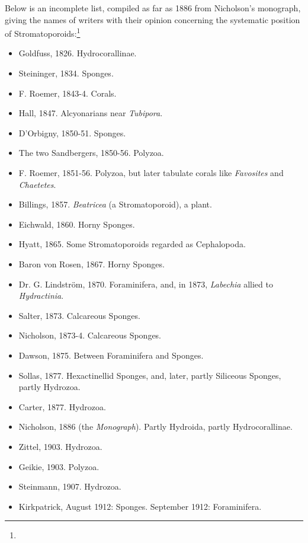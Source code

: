 \documentclass[a4paper, 12pt, oneside]{article}
\begin{document}
Below is an incomplete list, compiled as far as 1886 from Nicholson's monograph, giving the names of writers with their opinion concerning the systematic position of Stromatoporoids:\footnote{}
\begin{itemize}
    \item Goldfuss, 1826. Hydrocorallinae.
    \item Steininger, 1834. Sponges.
    \item F. Roemer, 1843-4. Corals.
    \item Hall, 1847. Alcyonarians near \emph{Tubipora}.
    \item D'Orbigny, 1850-51. Sponges.
    \item The two Sandbergers, 1850-56. Polyzoa.
    \item F. Roemer, 1851-56. Polyzoa, but later tabulate corals like \emph{Favosites} and \emph{Chaetetes}.
    \item Billings, 1857. \emph{Beatricea} (a Stromatoporoid), a plant.
    \item Eichwald, 1860. Horny Sponges.
    \item Hyatt, 1865. Some Stromatoporoids regarded as Cephalopoda.
    \item Baron von Rosen, 1867. Horny Sponges.
    \item Dr. G. Lindström, 1870. Foraminifera, and, in 1873, \emph{Labechia} allied to \emph{Hydractinia}.
    \item Salter, 1873. Calcareous Sponges.
    \item Nicholson, 1873-4. Calcareous Sponges.
    \item Dawson, 1875. Between Foraminifera and Sponges.
    \item Sollas, 1877. Hexactinellid Sponges, and, later, partly Siliceous Sponges, partly Hydrozoa.
    \item Carter, 1877. Hydrozoa.
    \item Nicholson, 1886 (the \emph{Monograph}). Partly Hydroida, partly Hydrocorallinae.
    \item Zittel, 1903. Hydrozoa.
    \item Geikie, 1903. Polyzoa.
    \item Steinmann, 1907. Hydrozoa.
    \item Kirkpatrick, August 1912: Sponges. September 1912: Foraminifera.
\end{itemize}
\end{document}
